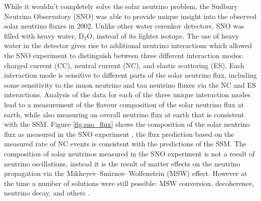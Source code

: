 While it wouldn't completely solve the solar neutrino problem, the Sudbury
Neutrino Observatory (SNO) was able to provide unique insight into the observed
solar neutrino fluxes in 2002. Unlike other water cerenkov detectors, SNO 
was filled with heavy water, \(\mbox{D}_2\mbox{O}\), instead of its lighter 
isotope. The use of heavy water in the detector gives rise to additional 
neutrino interactions which allowed the SNO experiment to distinguish between 
three different interaction modes: charged current (CC), neutral current (NC), 
and elastic scattering (ES). Each interaction mode is sensitive to different 
parts of the solar neutrino flux, including some sensitivity to the muon 
neutrino and tau neutrino fluxes via the NC and ES interactions. Analysis of the 
data for each of the three unique interaction modes lead to a measurement of 
the flavour composition of the solar neutrino flux at earth, while also 
measuring an overall neutrino flux at earth that is consistent with the SSM.
Figure \ref{fig:sno_flux} shows the composition of the solar neutrino flux as 
measured in the SNO experiment \cite{Ahmad2002}, the flux prediction based on 
the measured rate of NC events is consistent with the predictions of the 
SSM. The composition of solar neutrinos measured in the SNO experiment is not
a result of neutrino oscillations, instead it is the result of matter effects on
the neutrino propagation via the Mikheyev–Smirnov–Wolfenstein (MSW) effect.
However at the time a number of solutions were still possible: MSW conversion,
decoherence, neutrino decay, and others \cite{Smirnov2016}. 

